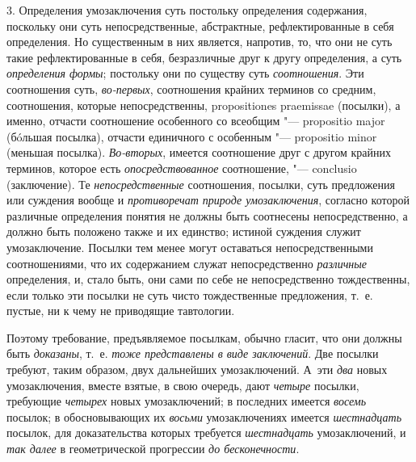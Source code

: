 {{3. Определения умозаключения суть постольку определения
содержания, поскольку они суть непосредственные, абстрактные,
рефлектированные в себя определения. Но существенным в них является,
напротив, то, что они не суть такие рефлектированные в себя, безразличные
друг к другу определения, а суть
{\em определения формы};
постольку они по существу суть
{\em соотношения}. Эти
соотношения суть, {\em во-первых},
соотношения крайних терминов со средним, соотношения, которые
непосредственны, propositiones praemissae (посылки), а
именно, отчасти соотношение особенного со всеобщим "--- propositio major
(бóльшая посылка), отчасти единичного с особенным "---
propositio minor (меньшая посылка).
{\em Во-вторых}, имеется
соотношение друг с другом крайних терминов, которое есть
{\em опосредствованное}
соотношение, "--- conclusio (заключение). Те
{\em непосредственные}
соотношения, посылки, суть предложения или суждения вообще и
{\em противоречат природе
умозаключения}, согласно которой различные определения
понятия не должны быть соотнесены непосредственно, а должно быть положено
также и их единство; истиной суждения служит умозаключение. Посылки тем
менее могут оставаться непосредственными соотношениями, что их содержанием
служат непосредственно {\em различные}
определения, и, стало быть, они сами по себе не
непосредственно тождественны, если только эти посылки не суть чисто
тождественные предложения, т.~е. пустые, ни к чему не приводящие
тавтологии.

Поэтому требование, предъявляемое посылкам, обычно гласит, что
они должны быть {\em доказаны},
т.~е. {\em тоже
представлены в виде заключений}. Две посылки требуют, таким
образом, двух дальнейших умозаключений. А~эти
{\em два} новых
умозаключения, вместе взятые, в свою очередь, дают
{\em четыре} посылки,
требующие {\em четырех}
новых умозаключений; в последних имеется
{\em восемь} посылок; в
обосновывающих их {\em восьми}
умозаключениях имеется
{\em шестнадцать}
посылок, для доказательства которых требуется
{\em шестнадцать}
умозаключений, и {\em так
далее} в геометрической прогрессии
{\em до бесконечности}.

}}
